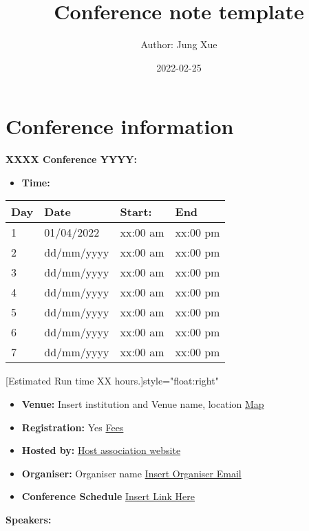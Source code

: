 \documentclass[
]{book}
\title{Conference note template}
\author{Author: Jung Xue}
\date{2022-02-25}
\providecommand{\tightlist}{%
  \setlength{\itemsep}{0pt}\setlength{\parskip}{0pt}}
\begin{document}
\maketitle

{
\setcounter{tocdepth}{1}
\tableofcontents
}
\hypertarget{conference-information}{%
\chapter*{Conference information}\label{conference-information}}

\textbf{XXXX Conference YYYY:}

\begin{itemize}
\tightlist
\item
  \textbf{Time:}
\end{itemize}

\begin{longtable}[]{@{}llll@{}}
\toprule
Day & Date & Start: & End \\
\midrule
\endhead
1 & 01/04/2022 & xx:00 am & xx:00 pm \\
2 & dd/mm/yyyy & xx:00 am & xx:00 pm \\
3 & dd/mm/yyyy & xx:00 am & xx:00 pm \\
4 & dd/mm/yyyy & xx:00 am & xx:00 pm \\
5 & dd/mm/yyyy & xx:00 am & xx:00 pm \\
6 & dd/mm/yyyy & xx:00 am & xx:00 pm \\
7 & dd/mm/yyyy & xx:00 am & xx:00 pm \\
\bottomrule
\end{longtable}

\hfill[Estimated Run time XX hours.]{style="float:right"}

\begin{itemize}
\tightlist
\item
  \textbf{Venue:} Insert institution and Venue name, location \href{}{Map}
\item
  \textbf{Registration:} Yes \href{}{Fees}
\item
  \textbf{Hosted by:} \href{}{Host association website}
\item
  \textbf{Organiser:} Organiser name \href{}{Insert Organiser Email}
\item
  \textbf{Conference Schedule} \href{}{Insert Link Here}
\end{itemize}

\textbf{Speakers:}
\end{document}
